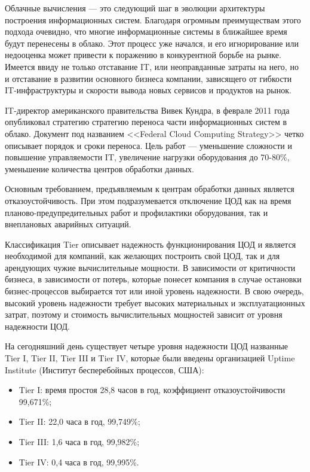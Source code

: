 Облачные вычисления --- это следующий шаг в эволюции архитектуры построения информационных систем.
Благодаря огромным преимуществам этого подхода очевидно, что многие информационные системы в ближайшее время будут перенесены в облако.
Этот процесс уже начался, и его игнорирование или недооценка может привести к поражению в конкурентной борьбе на рынке.
Имеется ввиду не только отставание IT, или неоправданные затраты на него, но и отставание в развитии основного бизнеса компании, зависящего от гибкости IT-инфраструктуры и скорости вывода новых сервисов и продуктов на рынок.

IT-директор американского правительства Вивек Кундра, в феврале 2011 года опубликовал стратегию стратегию переноса части информационных систем в облако.
Документ под названием <<Federal Cloud Computing Strategy>> четко описывает порядок и сроки переноса. 
Цель работ --- уменьшение сложности и повышение управляемости IT, увеличение нагрузки оборудования до 70-80\%, уменьшение количества центров обработки данных.

Основным требованием, предъявляемым к центрам обработки данных является отказоустойчивость.
При этом подразумевается отключение ЦОД как на время планово-предупредительных работ и профилактики оборудования, так и внеплановых аварийных ситуаций.

Классификация Tier описывает надежность функционирования ЦОД и является необходимой для компаний, как желающих построить свой ЦОД, так и для арендующих чужие вычислительные мощности.
В зависимости от критичности бизнеса, в зависимости от потерь, которые понесет компания в случае остановки бизнес-процессов выбирается тот или иной уровень надежности.
В свою очередь, высокий уровень надежности требует высоких материальных и эксплуатационных затрат, поэтому и стоимость вычислительных мощностей зависит от уровня надежности ЦОД. \cite{dc-tier}

На сегодняшний день существует четыре уровня надежности ЦОД названные Tier I, Tier II, Tier III и Tier IV, которые были введены организацией Uptime Institute (Институт бесперебойных процессов, США):
\begin{itemize}
  \item Tier I: время простоя 28,8 часов в год, коэффициент отказоустойчивости 99,671\%;
  \item Tier II: 22,0 часа в год, 99,749\%;
  \item Tier III: 1,6 часа в год, 99,982\%;
  \item Tier IV: 0,4 часа в год, 99,995\%.
\end{itemize}

